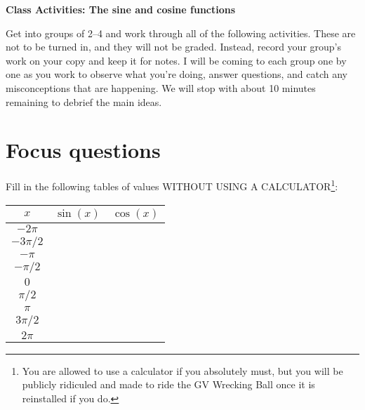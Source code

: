\documentclass[11pt]{article}
\begin{document}
	
	\thispagestyle{empty}
	\renewcommand{\headrulewidth}{0.0pt}
	\thispagestyle{fancy}
	\lfoot{}
	\cfoot{}
	\rfoot{}	
	
	\vspace*{0in}

		\begin{center}
			\begin{large}
			\textbf{Class Activities: The sine and cosine functions} \\
			\end{large}
		\end{center}
	
Get into groups of 2--4 and work through all of the following activities. These are not to be turned in, and they will not be graded. Instead, record your group's work on your copy and keep it for notes. I will be coming to each group one by one as you work to observe what you're doing, answer questions, and catch any misconceptions that are happening. We will stop with about 10 minutes remaining to debrief the main ideas. \\

\section{Focus questions}

Fill in the following tables of values WITHOUT USING A CALCULATOR\footnote{You are allowed to use a calculator if you absolutely must, but you will be publicly ridiculed and made to ride the GV Wrecking Ball once it is reinstalled if you do.}: 

\begin{center}
	\begin{tabular}{c||c||c}
	$x$ & $\sin(x)$ & $\cos(x)$ \\ \hline
	$-2\pi$ & \hspace{1in} & \hspace{1in} \\
	$-3\pi/2$ & & \\ \hline
	$-\pi$ & & \\  
	$-\pi/2$ & & \\ \hline
	$0$ & & \\ 
	$\pi/2$ & & \\ \hline
	$\pi$ & & \\ 
	$3 \pi/2$ & & \\ \hline
	$2 \pi$ & & 
	\end{tabular}
\end{center}
\end{document}
